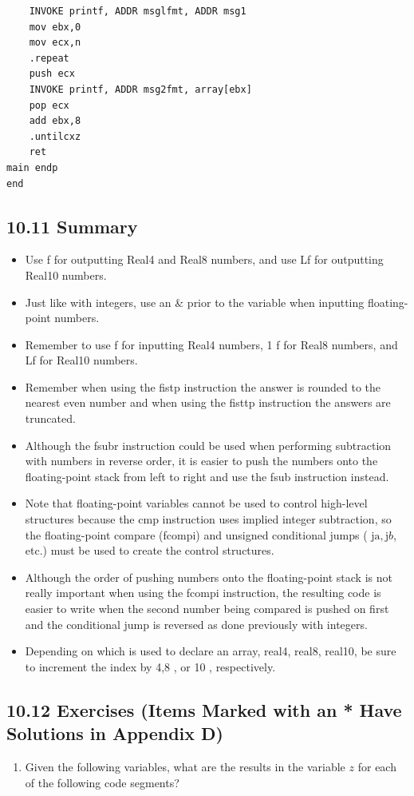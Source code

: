 \documentclass[10pt]{article}
\begin{document}
\begin{verbatim}
    INVOKE printf, ADDR msglfmt, ADDR msg1
    mov ebx,0
    mov ecx,n
    .repeat
    push ecx
    INVOKE printf, ADDR msg2fmt, array[ebx]
    pop ecx
    add ebx,8
    .untilcxz
    ret
main endp
end
\end{verbatim}

\subsection*{10.11 Summary}
\begin{itemize}
  \item Use f for outputting Real4 and Real8 numbers, and use Lf for outputting Real10 numbers.
  \item Just like with integers, use an \& prior to the variable when inputting floating-point numbers.
  \item Remember to use f for inputting Real4 numbers, 1 f for Real8 numbers, and Lf for Real10 numbers.
  \item Remember when using the fistp instruction the answer is rounded to the nearest even number and when using the fisttp instruction the answers are truncated.
  \item Although the fsubr instruction could be used when performing subtraction with numbers in reverse order, it is easier to push the numbers onto the floating-point stack from left to right and use the fsub instruction instead.
  \item Note that floating-point variables cannot be used to control high-level structures because the cmp instruction uses implied integer subtraction, so the floating-point compare (fcompi) and unsigned conditional jumps ( $\mathrm{ja}, \mathrm{j} b$, etc.) must be used to create the control structures.
  \item Although the order of pushing numbers onto the floating-point stack is not really important when using the fcompi instruction, the resulting code is easier to write when the second number being compared is pushed on first and the conditional jump is reversed as done previously with integers.
  \item Depending on which is used to declare an array, real4, real8, real10, be sure to increment the index by 4,8 , or 10 , respectively.
\end{itemize}

\subsection*{10.12 Exercises (Items Marked with an * Have Solutions in Appendix D)}
\begin{enumerate}
  \item Given the following variables, what are the results in the variable $z$ for each of the following code segments?
\end{enumerate}
\end{document}
